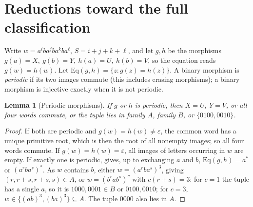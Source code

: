 \documentclass[11pt]{article}
\newtheorem{lemma}[theorem]{Lemma}
\newcommand{\eps}{\varepsilon}
\theoremstyle{remark}\newtheorem*{remark}{Remark}
\begin{document}
\section{Reductions toward the full classification}
Write \(w=a^iba^jba^kba^\ell\), \(S=i+j+k+\ell\), and let \(g,h\) be the morphisms \(g(a)=X,\ g(b)=Y,\ h(a)=U,\ h(b)=V\), so the equation reads \(g(w)=h(w)\). Let \(\mathrm{Eq}(g,h)=\{z: g(z)=h(z)\}\). A binary morphism is \emph{periodic} if its two images commute (this includes erasing morphisms); a binary morphism is injective exactly when it is not periodic.

\begin{lemma}[Periodic morphisms]\label{perred}
If \(g\) or \(h\) is periodic, then \(X=U,\ Y=V\), or all four words commute, or the tuple lies in family \(A\), family \(B\), or \(\{0100,0010\}\).
\end{lemma}
\begin{proof}
If both are periodic and \(g(w)=h(w)\ne\eps\), the common word has a unique primitive root, which is then the root of all nonempty images; so all four words commute. If \(g(w)=h(w)=\eps\), all images of letters occurring in \(w\) are empty. If exactly one is periodic, \cite[Theorem 1]{periodic} gives, up to exchanging \(a\) and \(b\), \(\mathrm{Eq}(g,h)=a^*\) or \((a^rba^s)^*\). As \(w\) contains \(b\), either \(w=(a^rba^s)^3\), giving \((r,r+s,r+s,s)\in A\), or \(w=(b^rab^s)^c\) with \(c(r+s)=3\): for \(c=1\) the tuple has a single \(a\), so it is \(1000,0001\in B\) or \(0100,0010\); for \(c=3\), \(w\in\{(ab)^3,(ba)^3\}\subseteq A\). The tuple \(0000\) also lies in \(A\).
\end{proof}
\end{document}
